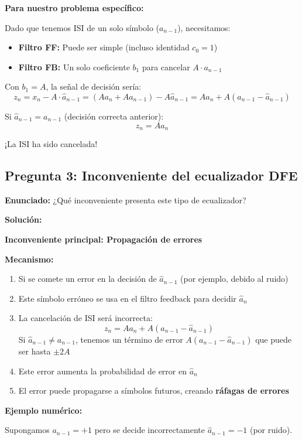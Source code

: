 \documentclass[11pt,a4paper]{article}
\begin{document}
\textbf{Para nuestro problema específico:}

Dado que tenemos ISI de un solo símbolo ($a_{n-1}$), necesitamos:
\begin{itemize}
    \item \textbf{Filtro FF:} Puede ser simple (incluso identidad $c_0 = 1$)
    \item \textbf{Filtro FB:} Un solo coeficiente $b_1$ para cancelar $A \cdot a_{n-1}$
\end{itemize}

Con $b_1 = A$, la señal de decisión sería:
\[
z_n = x_n - A \cdot \hat{a}_{n-1} = (A a_n + A a_{n-1}) - A \hat{a}_{n-1} = A a_n + A(a_{n-1} - \hat{a}_{n-1})
\]

Si $\hat{a}_{n-1} = a_{n-1}$ (decisión correcta anterior):
\[
z_n = A a_n
\]

¡La ISI ha sido cancelada!

\subsection*{Pregunta 3: Inconveniente del ecualizador DFE}

\textbf{Enunciado:} ¿Qué inconveniente presenta este tipo de ecualizador?

\vspace{0.3cm}
\textbf{Solución:}

\textbf{Inconveniente principal: Propagación de errores}

\textbf{Mecanismo:}

\begin{enumerate}
    \item Si se comete un error en la decisión de $\hat{a}_{n-1}$ (por ejemplo, debido al ruido)
    \item Este símbolo erróneo se usa en el filtro feedback para decidir $\hat{a}_n$
    \item La cancelación de ISI será incorrecta:
    \[
    z_n = A a_n + A(a_{n-1} - \hat{a}_{n-1})
    \]
    Si $\hat{a}_{n-1} \neq a_{n-1}$, tenemos un término de error $A(a_{n-1} - \hat{a}_{n-1})$ que puede ser hasta $\pm 2A$
    \item Este error aumenta la probabilidad de error en $\hat{a}_n$
    \item El error puede propagarse a símbolos futuros, creando \textbf{ráfagas de errores}
\end{enumerate}

\textbf{Ejemplo numérico:}

Supongamos $a_{n-1} = +1$ pero se decide incorrectamente $\hat{a}_{n-1} = -1$ (por ruido).
\end{document}
